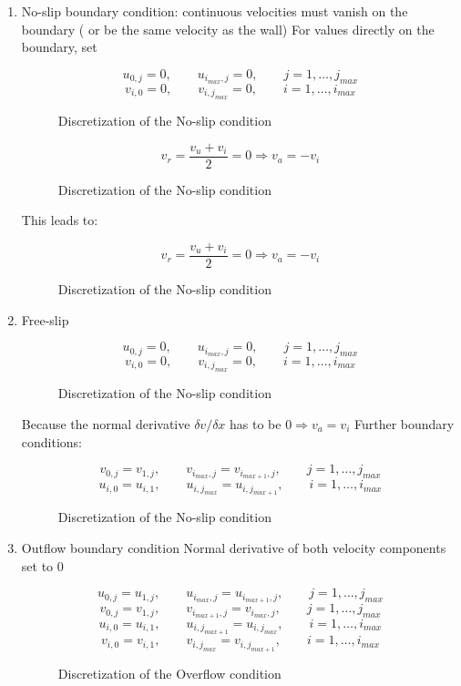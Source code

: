 \documentclass[a4paper,11pt]{scrartcl}
\begin{document}
\begin{enumerate}
	\item No-slip boundary condition: continuous velocities must vanish on the boundary ( or be the same velocity as the wall)
For values directly on the boundary, set
\begin{figure}[H]
	\centering
	\[ u_{0,j} = 0, \qquad u_{i_{max},j} = 0, \qquad j = 1,\dots,j_{max} \]
	\[ v_{i,0} = 0, \qquad v_{i,j_{max}} = 0, \qquad i = 1,\dots,i_{max} \]
	\renewcommand{\thefigure}{3.21}
	\caption{Discretization of the No-slip condition}
	\label{fig:disc-nosplipa}
\end{figure}

\begin{figure}[H]
	\centering
	\[ v_r = \frac{v_u + v_i}{2} = 0 \Rightarrow v_a = -v_i\]
	\renewcommand{\thefigure}{3.22}
	\caption{Discretization of the No-slip condition}
	\label{fig:disc-nosplipb}
\end{figure}

This leads to:
\begin{figure}[H]
	\centering
	\[ v_r = \frac{v_u + v_i}{2} = 0 \Rightarrow v_a = -v_i\]
	\renewcommand{\thefigure}{3.23}
	\caption{Discretization of the No-slip condition}
	\label{fig:disc-nosplipc}
\end{figure}

	\item Free-slip
\begin{figure}[H]
	\centering
	\[ u_{0,j} = 0, \qquad u_{i_{max},j} = 0, \qquad j = 1,\dots,j_{max} \]
	\[ v_{i,0} = 0, \qquad v_{i,j_{max}} = 0, \qquad i = 1,\dots,i_{max} \]
	\renewcommand{\thefigure}{3.24}
	\caption{Discretization of the No-slip condition}
	\label{fig:disc-freesplipa}
\end{figure}

Because the normal derivative $\delta v/ \delta x$ has to be $0 \Rightarrow v_a = v_i$ Further boundary conditions:
\begin{figure}[H]
	\centering
	\[ v_{0,j} = v_{1,j}, \qquad v_{i_{max},j} = v_{i_{max+1}, j}, \qquad j = 1,\dots,j_{max} \]
	\[ u_{i,0} = u_{i,1}, \qquad u_{i,j_{max}} = u_{i,j_{max+1}}, \qquad i = 1,\dots,i_{max} \]
	\renewcommand{\thefigure}{3.25}
	\caption{Discretization of the No-slip condition}
	\label{fig:disc-freesplipb}
\end{figure}
	
	
	\item Outflow boundary condition
Normal derivative of both velocity components set to 0
\begin{figure}[H]
	\centering
	\[ u_{0,j} = u_{1,j}, \qquad u_{i_{max},j} = u_{i_{max+1}, j}, \qquad j = 1,\dots,j_{max} \]
	\[ v_{0,j} = v_{1,j}, \qquad v_{i_{max+1},j} = v_{i_{max}, j}, \qquad j = 1,\dots,j_{max} \]
	\[ u_{i,0} = u_{i,1}, \qquad u_{i,j_{max+1}} = u_{i,j_{max}}, \qquad i = 1,\dots,i_{max} \]
	\[ v_{i,0} = v_{i,1}, \qquad v_{i,j_{max}} = v_{i,j_{max+1}}, \qquad i = 1,\dots,i_{max} \]
	\renewcommand{\thefigure}{3.26}
	\caption{Discretization of the Overflow condition}
	\label{fig:disc-outflow}
\end{figure}



\end{enumerate}
\end{document}
